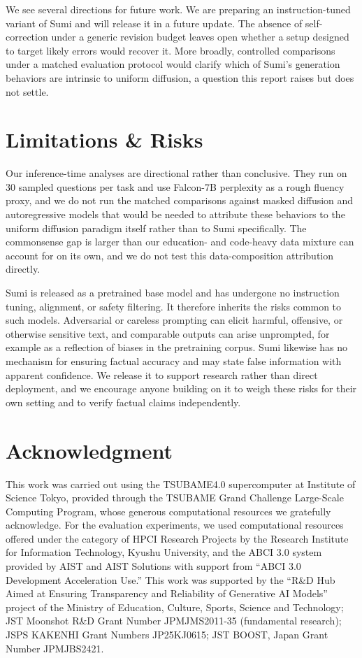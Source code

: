 \documentclass[11pt, a4paper]{style}
\begin{document}
We see several directions for future work. We are preparing an instruction-tuned
variant of Sumi and will release it in a future update.
The absence of self-correction under a generic revision budget leaves open
whether a setup designed to target likely errors would recover it.
More broadly, controlled comparisons under a matched evaluation protocol would
clarify which of Sumi's generation behaviors are intrinsic to uniform diffusion,
a question this report raises but does not settle.

\section*{Limitations \& Risks}
\label{sec:limitations}
Our inference-time analyses are directional rather than conclusive. They run on
30 sampled questions per task and use Falcon-7B perplexity as a rough fluency
proxy, and we do not run the matched comparisons against masked diffusion and
autoregressive models that would be needed to attribute these behaviors to the
uniform diffusion paradigm itself rather than to Sumi specifically.
The commonsense gap is larger than our education- and code-heavy data mixture
can account for on its own, and we do not test this data-composition attribution
directly.

Sumi is released as a pretrained base model and has undergone no instruction
tuning, alignment, or safety filtering. It therefore inherits the risks common
to such models.
Adversarial or careless prompting can elicit harmful, offensive, or otherwise
sensitive text, and comparable outputs can arise unprompted, for example as a
reflection of biases in the pretraining corpus.
Sumi likewise has no mechanism for ensuring factual accuracy and may state false
information with apparent confidence. We release it to support research rather
than direct deployment, and we encourage anyone building on it to weigh these
risks for their own setting and to verify factual claims independently.

\section*{Acknowledgment}
This work was carried out using the TSUBAME4.0 supercomputer at Institute of Science Tokyo, provided through the TSUBAME Grand Challenge Large-Scale Computing Program, whose generous computational resources we gratefully acknowledge.
For the evaluation experiments, we used computational resources offered under the category of HPCI Research Projects by the Research Institute for Information Technology, Kyushu University, and the ABCI 3.0 system provided by AIST and AIST Solutions with support from ``ABCI 3.0 Development Acceleration Use.''
This work was supported by the ``R\&D Hub Aimed at Ensuring Transparency and Reliability of Generative AI Models'' project of the Ministry of Education, Culture, Sports, Science and Technology; JST Moonshot R\&D Grant Number JPMJMS2011-35 (fundamental research); JSPS KAKENHI Grant Numbers JP25KJ0615; JST BOOST, Japan Grant Number JPMJBS2421.




\clearpage
\end{document}
